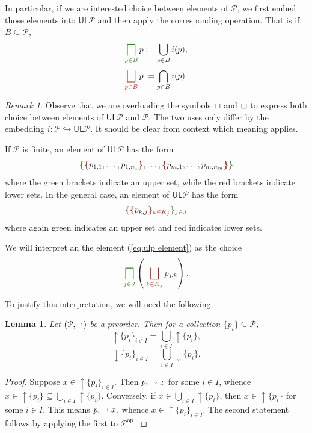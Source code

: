\documentclass[12pt]{article}
\theoremstyle{definition}
\theoremstyle{plain}
\newtheorem{lemma}[definition]{Lemma}
\theoremstyle{plain}
\theoremstyle{plain}
\theoremstyle{plain}
\theoremstyle{remark}
\theoremstyle{remark}
\newtheorem{remark}[definition]{Remark}
\newcommand{\mc}[1]{\mathcal{#1}}
\newcommand{\sub}{\subseteq}
\newcommand{\low}{\mathsf{L}}
\newcommand{\upper}{\mathsf{U}}
\newcommand{\upc}[1]{{\uparrow #1}}
\newcommand{\lwc}[1]{{\downarrow #1}}
\newcommand{\cbigsqcap}[1]{\color{OliveGreen}\bigsqcap_{#1}\color{Black}}
\newcommand{\csqcap}{\color{OliveGreen}\bm{\sqcap}\color{Black}}
\newcommand{\cbigsqcup}[1]{\color{BrickRed}\bigsqcup_{#1}\color{Black}}
\newcommand{\csqcup}{\color{BrickRed}\bm{\sqcup}\color{Black}}
\begin{document}
In particular, if we are interested choice between elements of $\mc{P}$, we first embed those elements into $\upper\low\mc{P}$ and then apply the corresponding operation. That is if $B \sub \mc{P}$,
$$ \cbigsqcap{p \in B} p :=  \bigcup_{p \in B} i(p),$$
$$ \cbigsqcup{p \in B} p := \bigcap_{p \in B} i(p).$$
\begin{remark}
	Observe that we are overloading the symbols $\csqcap$ and $\csqcup$ to express both choice between elements of $\upper\low\mc{P}$ and $\mc{P}$. The two uses only differ by the embedding $i: \mc{P} \hookrightarrow \upper\low\mc{P}$. It should be clear from context which meaning applies. 
\end{remark}

If $\mc{P}$ is finite, an element of $\upper\low\mc{P}$ has the form
$$\color{OliveGreen} \bm{\{} \color{Black} \color{BrickRed} \bm{\{} \color{Black} p_{1,1}, \ldots, p_{1,n_1} \color{BrickRed} \bm{\}} \color{Black}, \ldots, \color{BrickRed} \bm{\{} \color{Black} p_{m,1}, \ldots, p_{m,n_m} \color{BrickRed} \bm{\}} \color{Black}  \color{OliveGreen} \bm{\}} \color{Black}$$
where the green brackets indicate an upper set, while the red brackets indicate lower sets. In the general case, an element of $\upper\low\mc{P}$ has the form
\begin{equation}\label{eq:ulp element}
	\color{OliveGreen} \bm{\{} \color{Black} \color{BrickRed} \bm{\{} \color{Black} p_{k,j} \color{BrickRed} \bm{\}}_{k \in K_j} \color{Black}  \color{OliveGreen} \bm{\}}_{j \in J} \color{Black}
\end{equation}
where again green indicates an upper set and red indicates lower sets.

We will interpret an the element (\ref{eq:ulp element}) as the choice
$$\cbigsqcap{j \in J} \left( \: \cbigsqcup{k \in K_j} p_{j,k} \right).$$

To justify this interpretation, we will need the following

\begin{lemma}\label{lem:exchange upc}
	Let $(\mc{P},\shortrightarrow)$ be a preorder. Then for a collection $\{p_i\} \sub \mc{P}$,
	$$ \upc{\{p_i\}_{i \in I}} = \bigcup_{i \in I} \upc{\{p_i\}},$$
	$$ \lwc{\{p_i\}_{i \in I}} = \bigcup_{i \in I} \lwc{\{p_i\}}.$$
\end{lemma}
\begin{proof}
	Suppose $x \in \upc{\{p_i\}_{i \in I}}$. Then $p_i \shortrightarrow x$ for some $i \in I$, whence $x \in \upc{\{p_i\}} \sub \bigcup_{i \in I} \upc{\{p_i\}}$. Conversely, if $x \in \bigcup_{i \in I} \upc{\{p_i\}}$, then $x \in \upc{\{p_i\}}$ for some $i \in I$. This means $p_i \shortrightarrow x$, whence $x \in \upc{\{p_i\}_{i \in I}}$. The second statement follows by applying the first to $\mc{P}^\text{op}$.
\end{proof}
\end{document}
